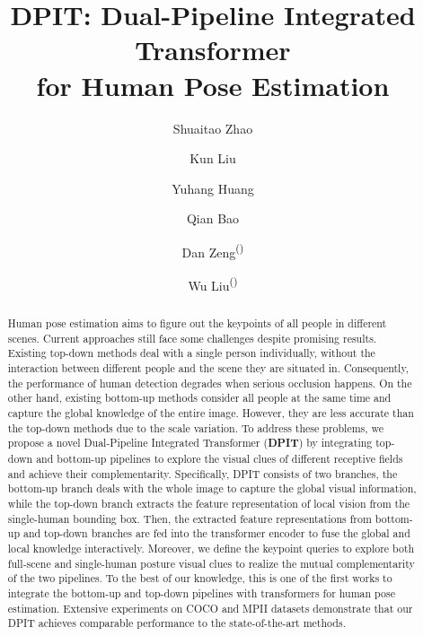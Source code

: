 \documentclass[runningheads]{llncs}
\begin{document}
\title{DPIT: Dual-Pipeline Integrated Transformer \\for Human Pose Estimation}

\begin{comment}
\end{comment}




\author{Shuaitao Zhao \and
Kun Liu \and
Yuhang Huang \and
Qian Bao \and
Dan Zeng\textsuperscript{(\Letter)} \and
Wu Liu\textsuperscript{(\Letter)}}

\maketitle              

\begin{abstract}
Human pose estimation aims to figure out the keypoints of all people in different scenes. Current approaches still face some challenges despite promising results. Existing top-down methods deal with a single person individually, without the interaction between different people and the scene they are situated in. Consequently, the performance of human detection degrades when serious occlusion happens. On the other hand, existing bottom-up methods consider all people at the same time and capture the global knowledge of the entire image. However, they are less accurate than the top-down methods due to the scale variation. To address these problems, we propose a novel Dual-Pipeline Integrated Transformer (\textbf{DPIT}) by integrating top-down and bottom-up pipelines to explore the visual clues of different receptive fields and achieve their complementarity. Specifically, DPIT consists of two branches, the bottom-up branch deals with the whole image to capture the global visual information, while the top-down branch extracts the feature representation of local vision from the single-human bounding box. Then, the extracted feature representations from bottom-up and top-down branches are fed into the transformer encoder to fuse the global and local knowledge interactively. Moreover, we define the keypoint queries to explore both full-scene and single-human posture visual clues to realize the mutual complementarity of the two pipelines. To the best of our knowledge, this is one of the first works to integrate the bottom-up and top-down pipelines with transformers for human pose estimation. Extensive experiments on COCO and MPII datasets demonstrate that our DPIT achieves comparable performance to the state-of-the-art methods.


\end{abstract}
\end{document}
